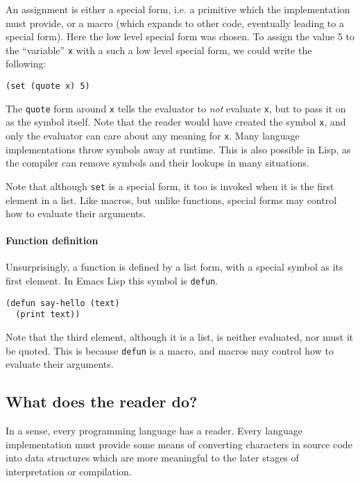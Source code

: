\documentclass[a4paper]{article}
\newcommand{\el}{Emacs Lisp}
\newcommand{\sym}[1]{\texttt{#1}}
\newcommand{\fun}[1]{\texttt{#1}}
\begin{document}
An assignment is either a special form, i.e. a primitive which the
implementation must provide, or a macro (which expands to other code, eventually
leading to a special form).  Here the low level special form was chosen.  To
assign the value 5 to the ``variable'' \sym{x} with a such a low level special
form, we could write the following:

\begin{verbatim}
(set (quote x) 5)
\end{verbatim}

The \fun{quote} form around \sym{x} tells the evaluator to \emph{not} evaluate
\sym{x}, but to pass it on as the symbol itself.  Note that the reader would
have created the symbol \sym{x}, and only the evaluator can care about any
meaning for \sym{x}.  Many language implementations throw symbols away at
runtime.  This is also possible in Lisp, as the compiler can remove symbols and
their lookups in many situations.

Note that although \fun{set} is a special form, it too is invoked when it is the
first element in a list.  Like macros, but unlike functions, special forms may
control how to evaluate their arguments.

\paragraph{Function definition}
\label{par:function-def}
Unsurprisingly, a function is defined by a list form, with a special symbol as
its first element.  In \el{} this symbol is \fun{defun}.

\begin{verbatim}
(defun say-hello (text)
  (print text))
\end{verbatim}

Note that the third element, although it is a list, is neither evaluated, nor
must it be quoted.  This is because \fun{defun} is a macro, and macros may
control how to evaluate their arguments.

\subsection{What does the reader do?}
\label{subsec:what-does-the-reader-do}
In a sense, every programming language has a reader.  Every language
implementation must provide some means of converting characters in source code
into data structures which are more meaningful to the later stages of
interpretation or compilation.
\end{document}
